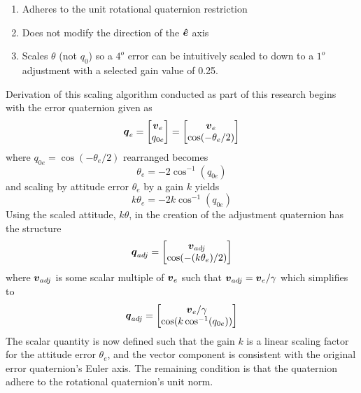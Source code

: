 \begin{enumerate}
  \item Adheres to the unit rotational quaternion restriction
  \item Does not modify the direction of the $\boldsymbol{\hat{e}}$ axis
  \item Scales $\theta$ (not $q_0$) so a $4^o$ error can be intuitively scaled to down to a $1^o$ adjustment with a selected gain value of 0.25.
\end{enumerate}
Derivation of this scaling algorithm conducted as part of this research begins with the error quaternion given as
\begin{equation}
  \boldsymbol{q}_e = \begin{bmatrix} \boldsymbol{v}_e \\ q_{0e} \end{bmatrix} = \begin{bmatrix} \boldsymbol{v}_e \\ \cos(-\theta_e / 2) \end{bmatrix}
\end{equation}
where $q_{0e} = \cos(-\theta_e/2)$ rearranged becomes
\begin{equation}
  \theta_e = -2 \cos^{-1}(q_{0e})
\end{equation}
and scaling by attitude error $\theta_e$ by a gain $k$ yields
\begin{equation}
  k\theta_e = -2 k\cos^{-1}(q_{0e})
\end{equation}
Using the scaled attitude, $k\theta$, in the creation of the adjustment quaternion has the structure
\begin{equation}
  \boldsymbol{q}_{adj} = \begin{bmatrix} \boldsymbol{v}_{adj} \\ \cos(-(k\theta_e) / 2) \end{bmatrix}
\end{equation}
where $\boldsymbol{v}_{adj}$ is some scalar multiple of $\boldsymbol{v}_e$ such that $\boldsymbol{v}_{adj} = \boldsymbol{v}_{e} / \gamma$ which simplifies to
\begin{equation}
  \boldsymbol{q}_{adj} = \begin{bmatrix} \boldsymbol{v}_{e} / \gamma \\ \cos( k \cos^{-1} (q_{0e})) \end{bmatrix}
  \label{eqn:almost_there}
\end{equation}
The scalar quantity is now defined such that the gain $k$ is a linear scaling factor for the attitude error $\theta_e$, and the vector component is consistent with the original error quaternion's Euler axis.  The remaining condition is that the quaternion adhere to the rotational quaternion's unit norm.

